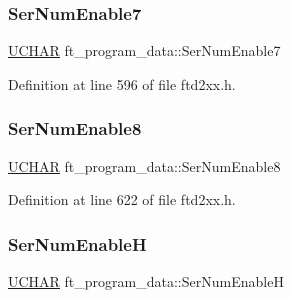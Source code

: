 \mbox{\label{structft__program__data_aced3a798466e623045b4c1cc891dcb93}} 
\subsubsection{\texorpdfstring{Ser\+Num\+Enable7}{SerNumEnable7}}
{\footnotesize\ttfamily \hyperlink{CatCaloProto40MHz_2inc_2WinTypes_8h_a4f4bb67531a9bf6f0b9c6ad76aeba587}{U\+C\+H\+AR} ft\+\_\+program\+\_\+data\+::\+Ser\+Num\+Enable7}



Definition at line 596 of file ftd2xx.\+h.

\mbox{\label{structft__program__data_ae2a623e2fc32537111ae317b4079fd2f}} 
\subsubsection{\texorpdfstring{Ser\+Num\+Enable8}{SerNumEnable8}}
{\footnotesize\ttfamily \hyperlink{CatCaloProto40MHz_2inc_2WinTypes_8h_a4f4bb67531a9bf6f0b9c6ad76aeba587}{U\+C\+H\+AR} ft\+\_\+program\+\_\+data\+::\+Ser\+Num\+Enable8}



Definition at line 622 of file ftd2xx.\+h.

\mbox{\label{structft__program__data_aff965810e81cec5c72164c76dfd9a1fb}} 
\subsubsection{\texorpdfstring{Ser\+Num\+EnableH}{SerNumEnableH}}
{\footnotesize\ttfamily \hyperlink{CatCaloProto40MHz_2inc_2WinTypes_8h_a4f4bb67531a9bf6f0b9c6ad76aeba587}{U\+C\+H\+AR} ft\+\_\+program\+\_\+data\+::\+Ser\+Num\+EnableH}



